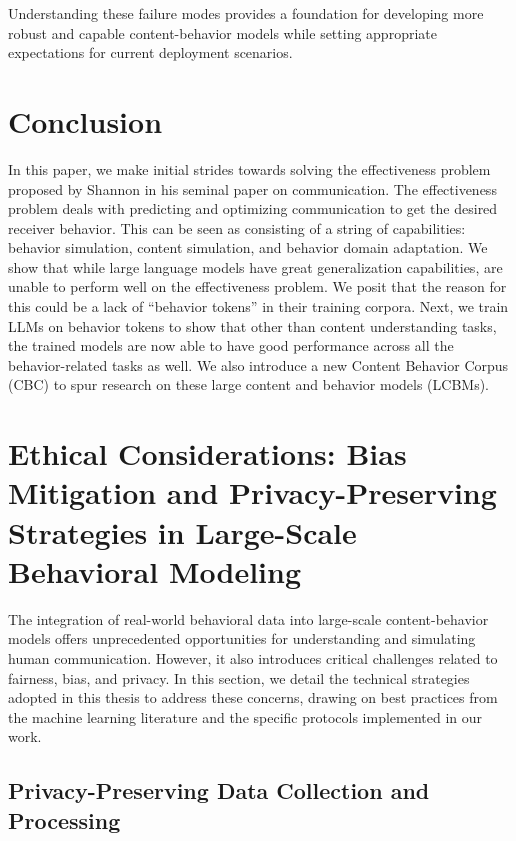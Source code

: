 Understanding these failure modes provides a foundation for developing more robust and capable content-behavior models while setting appropriate expectations for current deployment scenarios.

\section{Conclusion}
In this paper, we make initial strides towards solving the effectiveness problem proposed by Shannon in his seminal paper on communication. The effectiveness problem deals with predicting and optimizing communication to get the desired receiver behavior. This can be seen as consisting of a string of capabilities: behavior simulation, content simulation, and behavior domain adaptation. We show that while large language models have great generalization capabilities, are unable to perform well on the effectiveness problem. We posit that the reason for this could be a lack of ``behavior tokens'' in their training corpora. Next, we train LLMs on behavior tokens to show that other than content understanding tasks, the trained models are now able to have good performance across all the behavior-related tasks as well. We also introduce a new Content Behavior Corpus (CBC) to spur research on these large content and behavior models (LCBMs).






\section{Ethical Considerations: Bias Mitigation and Privacy-Preserving Strategies in Large-Scale Behavioral Modeling}
\label{sec:bias-privacy-appendix}
The integration of real-world behavioral data into large-scale content-behavior models offers unprecedented opportunities for understanding and simulating human communication. However, it also introduces critical challenges related to fairness, bias, and privacy. In this section, we detail the technical strategies adopted in this thesis to address these concerns, drawing on best practices from the machine learning literature and the specific protocols implemented in our work.

\subsection{Privacy-Preserving Data Collection and Processing}

